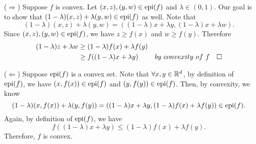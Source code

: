 \begin{prf}
	($\Rightarrow$) Suppose $f$ is convex. Let $(x,z),(y,w)\in\operatorname{epi}(f)$ and $\lambda\in(0,1)$. Our goal is to show that $(1-\lambda)(x,z)+\lambda(y,w)\in\operatorname{epi}(f)$ as well. Note that \[(1-\lambda)(x,z)+\lambda(y,w)=((1-\lambda)x+\lambda y, (1-\lambda)x+\lambda w).\] Since $(x,z),(y,w)\in\operatorname{epi}(f)$, we have $z\geq f(x)$ and $w\geq f(y)$. Therefore \begin{align*}(1-\lambda)z+\lambda w&\geq(1-\lambda)f(x)+\lambda f(y)\\&\geq f((1-\lambda)x+\lambda y)&by\ convexity\ of\ f\quad\square
	\end{align*}\par 
	($\Leftarrow$) Suppose $\operatorname{epi}(f)$ is a convex set. Note that $\forall x,y\in{\mathbb{R}}^d$, by definition of $\operatorname{epi}(f)$, we have $(x,f(x))\in\operatorname{epi}(f)$ and $(y,f(y))\in\operatorname{epi}(f)$. Then, by convexity, we know \[(1-\lambda)(x,f(x))+\lambda(y,f(y))=((1-\lambda)x+\lambda y,(1-\lambda)f(x)+\lambda f(y))\in\operatorname{epi}(f).\] Again, by definition of $\operatorname{epi}(f)$, we have \[f((1-\lambda)x+\lambda y)\leq(1-\lambda)f(x)+\lambda f(y).\] Therefore, $f$ is convex. 
\end{prf}


